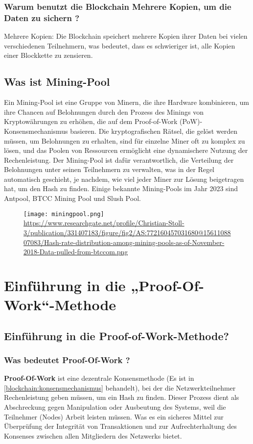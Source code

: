 \documentclass[ngerman]{scrreprt}
\begin{document}
\subsection{Warum benutzt die Blockchain Mehrere Kopien, um die Daten zu sichern ?}\label{blockchain:kopien} 
Mehrere Kopien: Die Blockchain speichert mehrere Kopien ihrer Daten bei vielen verschiedenen Teilnehmern, was bedeutet, dass es schwieriger ist, alle Kopien einer Blockkette zu zensieren.
 
 \section{Was ist Mining-Pool}
 Ein Mining-Pool ist eine Gruppe von Minern, die ihre Hardware kombinieren, um ihre Chancen auf Belohnungen durch den Prozess des Minings von Kryptowährungen zu erhöhen, die auf dem Proof-of-Work (PoW)-Konsensmechanismus basieren. Die kryptografischen Rätsel, die gelöst werden müssen, um Belohnungen zu erhalten, sind für einzelne Miner oft zu komplex zu lösen, und das Poolen von Ressourcen ermöglicht eine dynamischere Nutzung der Rechenleistung.  Der Mining-Pool ist dafür verantwortlich, die Verteilung der Belohnungen unter seinen Teilnehmern zu verwalten, was in der Regel automatisch geschieht, je nachdem, wie viel jeder Miner zur Lösung beigetragen hat, um den Hash zu finden.  Einige bekannte Mining-Pools im Jahr 2023 sind Antpool, BTCC Mining Pool und Slush Pool.
 
 \begin{figure}[H]
 	\texttt{[image: miningpool.png]}
 	\small{\url{https://www.researchgate.net/profile/Christian-Stoll-3/publication/331407183/figure/fig2/AS:772160457031680@1561108807083/Hash-rate-distribution-among-mining-pools-as-of-November-2018-Data-pulled-from-btccom.png}}
 \end{figure}




\chapter[Theoretische Seite der Proof-Of-Work-Methode]{Einführung in die „Proof-Of-Work“-Methode}	

\section{Einführung in die Proof-of-Work-Methode?}
\subsection{Was bedeutet Proof-Of-Work ?}
\textbf{Proof-Of-Work} ist eine dezentrale Konsensmethode (Es ist in \cref{blockchain:konsensmechanismus} behandelt), bei der die Netzwerkteilnehmer Rechenleistung geben müssen, um ein Hash zu finden. Dieser Prozess dient als Abschreckung gegen Manipulation oder Ausbeutung des Systems, weil die Teilnehmer (Nodes) Arbeit leisten müssen. Was es ein sicheres Mittel zur Überprüfung der Integrität von Transaktionen und zur Aufrechterhaltung des Konsenses zwischen allen Mitgliedern des Netzwerks bietet.
\end{document}
